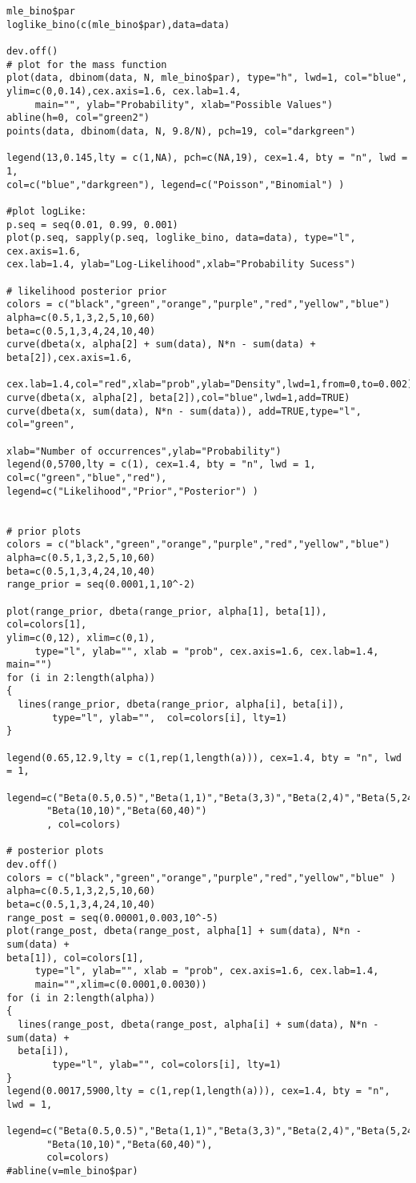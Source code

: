 \documentclass[a4paper, 11pt]{article}
\begin{document}
\begin{verbatim}
mle_bino$par
loglike_bino(c(mle_bino$par),data=data)

dev.off()
# plot for the mass function
plot(data, dbinom(data, N, mle_bino$par), type="h", lwd=1, col="blue",
ylim=c(0,0.14),cex.axis=1.6, cex.lab=1.4,
     main="", ylab="Probability", xlab="Possible Values")
abline(h=0, col="green2")
points(data, dbinom(data, N, 9.8/N), pch=19, col="darkgreen")

legend(13,0.145,lty = c(1,NA), pch=c(NA,19), cex=1.4, bty = "n", lwd = 1,
col=c("blue","darkgreen"), legend=c("Poisson","Binomial") )

#plot logLike:
p.seq = seq(0.01, 0.99, 0.001)
plot(p.seq, sapply(p.seq, loglike_bino, data=data), type="l", cex.axis=1.6,
cex.lab=1.4, ylab="Log-Likelihood",xlab="Probability Sucess")

# likelihood posterior prior
colors = c("black","green","orange","purple","red","yellow","blue")
alpha=c(0.5,1,3,2,5,10,60)
beta=c(0.5,1,3,4,24,10,40)
curve(dbeta(x, alpha[2] + sum(data), N*n - sum(data) + beta[2]),cex.axis=1.6,

cex.lab=1.4,col="red",xlab="prob",ylab="Density",lwd=1,from=0,to=0.002)
curve(dbeta(x, alpha[2], beta[2]),col="blue",lwd=1,add=TRUE)
curve(dbeta(x, sum(data), N*n - sum(data)), add=TRUE,type="l", col="green",

xlab="Number of occurrences",ylab="Probability")
legend(0,5700,lty = c(1), cex=1.4, bty = "n", lwd = 1,
col=c("green","blue","red"), legend=c("Likelihood","Prior","Posterior") )


# prior plots
colors = c("black","green","orange","purple","red","yellow","blue")
alpha=c(0.5,1,3,2,5,10,60)
beta=c(0.5,1,3,4,24,10,40)
range_prior = seq(0.0001,1,10^-2)

plot(range_prior, dbeta(range_prior, alpha[1], beta[1]), col=colors[1],
ylim=c(0,12), xlim=c(0,1),
     type="l", ylab="", xlab = "prob", cex.axis=1.6, cex.lab=1.4, main="")
for (i in 2:length(alpha))
{
  lines(range_prior, dbeta(range_prior, alpha[i], beta[i]), 
        type="l", ylab="",  col=colors[i], lty=1)
}

legend(0.65,12.9,lty = c(1,rep(1,length(a))), cex=1.4, bty = "n", lwd = 1, 
       legend=c("Beta(0.5,0.5)","Beta(1,1)","Beta(3,3)","Beta(2,4)","Beta(5,24)",
       "Beta(10,10)","Beta(60,40)")
       , col=colors)

# posterior plots
dev.off()
colors = c("black","green","orange","purple","red","yellow","blue" )
alpha=c(0.5,1,3,2,5,10,60)
beta=c(0.5,1,3,4,24,10,40)
range_post = seq(0.00001,0.003,10^-5)
plot(range_post, dbeta(range_post, alpha[1] + sum(data), N*n - sum(data) + 
beta[1]), col=colors[1],
     type="l", ylab="", xlab = "prob", cex.axis=1.6, cex.lab=1.4,
     main="",xlim=c(0.0001,0.0030))
for (i in 2:length(alpha))
{
  lines(range_post, dbeta(range_post, alpha[i] + sum(data), N*n - sum(data) +
  beta[i]), 
        type="l", ylab="", col=colors[i], lty=1)
}
legend(0.0017,5900,lty = c(1,rep(1,length(a))), cex=1.4, bty = "n", lwd = 1, 
       legend=c("Beta(0.5,0.5)","Beta(1,1)","Beta(3,3)","Beta(2,4)","Beta(5,24)",
       "Beta(10,10)","Beta(60,40)"), 
       col=colors)
#abline(v=mle_bino$par)



\end{verbatim}
\end{document}
